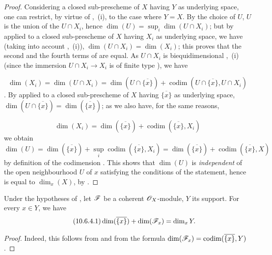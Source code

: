 \begin{proof}
Considering a closed sub-prescheme of $X$ having $Y$ as underlying space, one can restrict, by virtue of ,~(i), to the case where $Y=X$.
By the choice of $U$, $U$ is the union of the $U\cap X_i$, hence $\dim(U)=\sup_i\dim(U\cap X_i)$; but by  applied to a closed sub-prescheme of $X$ having $X_i$ as underlying space, we have (taking into account ,~(i)), $\dim(U\cap X_i)=\dim(X_i)$; this proves that the second and the fourth terms of  are equal.
As $U\cap X_i$ is biequidimensional ,~(i) (since the immersion $U\cap X_i\to X_i$ is of finite type ), we have

\begin{equation}
\label{IV.10.6.3.2}
\tag{10.6.3.2}
\dim(X_i)=\dim(U\cap X_i)=\dim(U\cap\overline{\{x\}})+\operatorname{codim}(U\cap\overline{\{x\}},U\cap X_i)
\end{equation}
.
By  applied to a closed sub-prescheme of $X$ having $\overline{\{x\}}$ as underlying space, $\dim(U\cap\overline{\{x\}})=\dim(\overline{\{x\}})$; as we also have, for the same reasons,

\begin{equation}
\label{IV.10.6.3.3}
\tag{10.6.3.3}
\dim(X_i)=\dim(\overline{\{x\}})+\operatorname{codim}(\overline{\{x\}},X_i)
\end{equation}
we obtain
\[
  \dim(U)=\dim(\overline{\{x\}})+\sup_i\operatorname{codim}(\overline{\{x\}},X_i)=\dim(\overline{\{x\}})+\operatorname{codim}(\overline{\{x\}},X)
\]
by definition of the codimension .
This shows that $\dim(U)$ is \emph{independent} of the open neighbourhood $U$ of $x$ satisfying the conditions of the statement, hence is equal to $\dim_x(X)$, by .
\end{proof}

\begin{corollary}[10.6.4]
\label{IV.10.6.4}
Under the hypotheses of , let $\mathscr{F}$ be a coherent $\mathscr{O}_X$-module, $Y$ its support.
For every $x\in Y$, we have
\begin{equation}
\label{IV.10.6.4.1}
\tag{10.6.4.1}
\dim(\overline{\{x\}})+\dim(\mathscr{F}_x)=\dim_x Y.
\end{equation}
\end{corollary}

\begin{proof}
Indeed, this follows from  and from the formula $\dim(\mathscr{F}_x)=\operatorname{codim}(\overline{\{x\}},Y)$ .
\end{proof}

